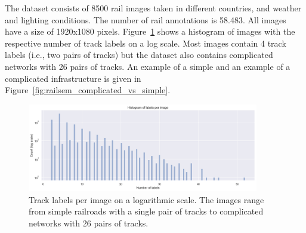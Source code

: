 \documentclass[Master,MDS,english]{BASE/twbook} %
\begin{document}
The dataset consists of 8500 rail images taken in different countries, and weather and lighting conditions. The number of rail annotations is 58.483. All images have a size of 1920x1080 pixels. 
Figure~\ref{fig:labels_per_image_railsem} shows a histogram of images with the respective number of track labels on a log scale. Most images contain 4 track labels (i.e., two pairs of tracks) but the dataset also contains complicated networks with 26 pairs of tracks. An example of a simple and an example of a complicated infrastructure is given in Figure~\ref{fig:railsem_complicated_vs_simple}.



\begin{figure}[h]
\centering
\includegraphics[width=0.9\textwidth]{images/datasets/railsem/labels_per_image}
\caption{Track labels per image on a logarithmic scale. The images range from simple railroads with a single pair of tracks to complicated networks with 26 pairs of tracks. }
\label{fig:labels_per_image_railsem}
\end{figure}
\end{document}
